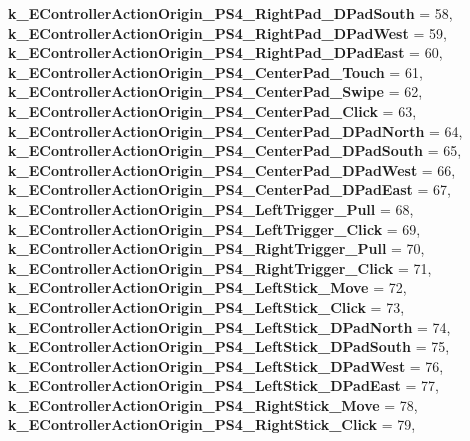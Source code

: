 \begin{DoxyCompactItemize}
{\bfseries k\+\_\+\+E\+Controller\+Action\+Origin\+\_\+\+P\+S4\+\_\+\+Right\+Pad\+\_\+\+D\+Pad\+South} = 58, 
{\bfseries k\+\_\+\+E\+Controller\+Action\+Origin\+\_\+\+P\+S4\+\_\+\+Right\+Pad\+\_\+\+D\+Pad\+West} = 59, 
\newline
{\bfseries k\+\_\+\+E\+Controller\+Action\+Origin\+\_\+\+P\+S4\+\_\+\+Right\+Pad\+\_\+\+D\+Pad\+East} = 60, 
{\bfseries k\+\_\+\+E\+Controller\+Action\+Origin\+\_\+\+P\+S4\+\_\+\+Center\+Pad\+\_\+\+Touch} = 61, 
{\bfseries k\+\_\+\+E\+Controller\+Action\+Origin\+\_\+\+P\+S4\+\_\+\+Center\+Pad\+\_\+\+Swipe} = 62, 
{\bfseries k\+\_\+\+E\+Controller\+Action\+Origin\+\_\+\+P\+S4\+\_\+\+Center\+Pad\+\_\+\+Click} = 63, 
\newline
{\bfseries k\+\_\+\+E\+Controller\+Action\+Origin\+\_\+\+P\+S4\+\_\+\+Center\+Pad\+\_\+\+D\+Pad\+North} = 64, 
{\bfseries k\+\_\+\+E\+Controller\+Action\+Origin\+\_\+\+P\+S4\+\_\+\+Center\+Pad\+\_\+\+D\+Pad\+South} = 65, 
{\bfseries k\+\_\+\+E\+Controller\+Action\+Origin\+\_\+\+P\+S4\+\_\+\+Center\+Pad\+\_\+\+D\+Pad\+West} = 66, 
{\bfseries k\+\_\+\+E\+Controller\+Action\+Origin\+\_\+\+P\+S4\+\_\+\+Center\+Pad\+\_\+\+D\+Pad\+East} = 67, 
\newline
{\bfseries k\+\_\+\+E\+Controller\+Action\+Origin\+\_\+\+P\+S4\+\_\+\+Left\+Trigger\+\_\+\+Pull} = 68, 
{\bfseries k\+\_\+\+E\+Controller\+Action\+Origin\+\_\+\+P\+S4\+\_\+\+Left\+Trigger\+\_\+\+Click} = 69, 
{\bfseries k\+\_\+\+E\+Controller\+Action\+Origin\+\_\+\+P\+S4\+\_\+\+Right\+Trigger\+\_\+\+Pull} = 70, 
{\bfseries k\+\_\+\+E\+Controller\+Action\+Origin\+\_\+\+P\+S4\+\_\+\+Right\+Trigger\+\_\+\+Click} = 71, 
\newline
{\bfseries k\+\_\+\+E\+Controller\+Action\+Origin\+\_\+\+P\+S4\+\_\+\+Left\+Stick\+\_\+\+Move} = 72, 
{\bfseries k\+\_\+\+E\+Controller\+Action\+Origin\+\_\+\+P\+S4\+\_\+\+Left\+Stick\+\_\+\+Click} = 73, 
{\bfseries k\+\_\+\+E\+Controller\+Action\+Origin\+\_\+\+P\+S4\+\_\+\+Left\+Stick\+\_\+\+D\+Pad\+North} = 74, 
{\bfseries k\+\_\+\+E\+Controller\+Action\+Origin\+\_\+\+P\+S4\+\_\+\+Left\+Stick\+\_\+\+D\+Pad\+South} = 75, 
\newline
{\bfseries k\+\_\+\+E\+Controller\+Action\+Origin\+\_\+\+P\+S4\+\_\+\+Left\+Stick\+\_\+\+D\+Pad\+West} = 76, 
{\bfseries k\+\_\+\+E\+Controller\+Action\+Origin\+\_\+\+P\+S4\+\_\+\+Left\+Stick\+\_\+\+D\+Pad\+East} = 77, 
{\bfseries k\+\_\+\+E\+Controller\+Action\+Origin\+\_\+\+P\+S4\+\_\+\+Right\+Stick\+\_\+\+Move} = 78, 
{\bfseries k\+\_\+\+E\+Controller\+Action\+Origin\+\_\+\+P\+S4\+\_\+\+Right\+Stick\+\_\+\+Click} = 79, 
\newline

\end{DoxyCompactItemize}

